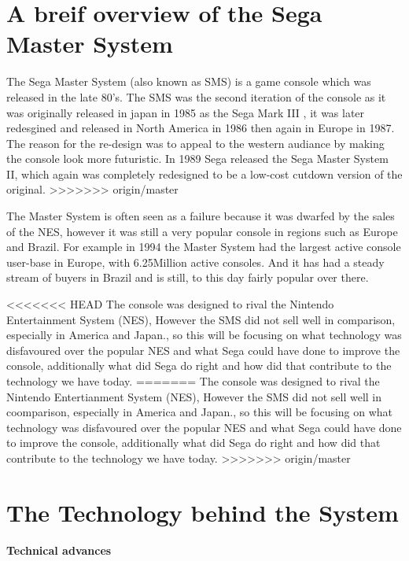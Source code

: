 \documentclass{scrartcl}
\begin{document}
\section{A breif overview of the Sega Master System}

The Sega Master System (also known as SMS) is a game console which was released in the late 80’s. The SMS was the second iteration of the console as it was originally released in japan in 1985 as the Sega Mark III \cite{Weiss2009}, it was later redesgined and released in North America in 1986 then again in Europe in 1987. The reason for the re-design was to appeal to the western audiance by making the console look more futuristic\cite{parkin}. In 1989 Sega released the Sega Master System II, which again was completely redesigned to be a low-cost cutdown version of the original.
>>>>>>> origin/master

The Master System is often seen as a failure because it was dwarfed by the sales of the NES, however it was still a very popular console in regions such as Europe and Brazil. For example in 1994 the Master System had the largest active console user-base in Europe, with 6.25Million active consoles.\cite{russell} And it has had a steady stream of buyers in Brazil and is still, to this day fairly popular over there.


<<<<<<< HEAD
The console was designed to rival the Nintendo Entertainment System (NES), However the SMS did not sell well in comparison, especially in America and Japan.\cite{Orland}, so this will be focusing on what technology was disfavoured over the popular NES and what Sega could have done to improve the console, additionally what did Sega do right and how did that contribute to the technology we have today.
=======
The console was designed to rival the Nintendo Entertianment System (NES), However the SMS did not sell well in coomparison, especially in America and Japan.\cite{Orland}, so this will be focusing on what technology was disfavoured over the popular NES and what Sega could have done to improve the console, additionally what did Sega do right and how did that contribute to the technology we have today.
>>>>>>> origin/master

\section{The Technology behind the System}

\textbf{Technical advances} \par
\end{document}
